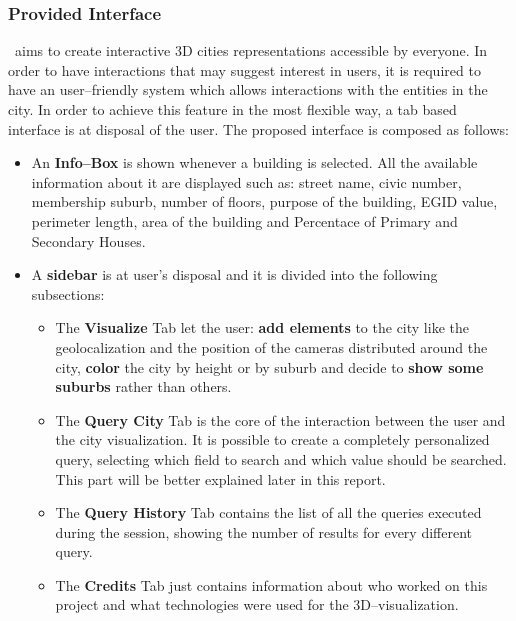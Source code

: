 \subsubsection{Provided Interface}
\applicationName\ aims to create interactive 3D cities representations accessible by everyone. In order to have interactions that may suggest interest in users, it is required to have an user--friendly system which allows interactions with the entities in the city. In order to achieve this feature in the most flexible way, a tab based interface is at disposal of the user. The proposed interface is composed as follows:
\begin{itemize}
	\item An {\bf Info--Box} is shown whenever a building is selected. All the available information about it are displayed such as: street name, civic number, membership suburb, number of floors, purpose of the building, EGID value, perimeter length, area of the building and Percentace of Primary and Secondary Houses.
	\item A {\bf sidebar} is at user's disposal and it is divided into the following subsections:
	\begin{itemize}
		\item The {\bf Visualize} Tab let the user: {\bf add elements} to the city like the geolocalization and the position of the cameras distributed around the city, {\bf color} the city by height or by suburb and decide to {\bf show some suburbs} rather than others.
		\item The {\bf Query City} Tab is the core of the interaction between the user and the city visualization. It is possible to create a completely personalized query, selecting which field to search and which value should be searched. This part will be better explained later in this report.
		\item The {\bf Query History} Tab contains the list of all the queries executed during the session, showing the number of results for every different query.
		\item The {\bf Credits} Tab just contains information about who worked on this project and what technologies were used for the 3D--visualization.
	\end{itemize}
\end{itemize}
